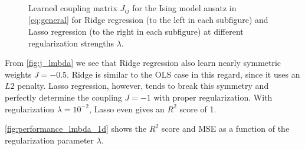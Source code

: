 \begin{figure}[H]
\qquad
{}
\qquad
{}
\caption{Learned coupling matrix $J_{ij}$ for the Ising model ansatz in \autoref{eq:general} for Ridge regression (to the left in each subfigure) and Lasso regression (to the right in each subfigure) at different regularization strengths $\lambda$. }
\label{fig:j_lmbda}
\end{figure}

From \autoref{fig:j_lmbda} we see that Ridge regression also learn nearly symmetric weights $J=-0.5$. Ridge is similar to the OLS case in this regard, since it uses an $L2$ penalty. Lasso regression, however, tends to break this symmetry and perfectly determine the coupling $J=-1$ with proper regularization. With regularization $\lambda = 10^{-2}$, Lasso even gives an $R^2$ score of 1.


\autoref{fig:performance_lmbda_1d} shows the $R^2$ score and MSE as a function of the regularization parameter $\lambda$.

